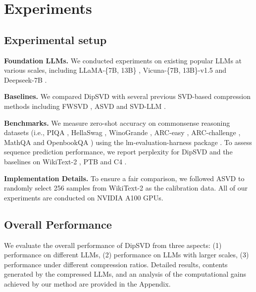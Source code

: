 \documentclass[11pt]{article}
\begin{document}
\section{Experiments}
\subsection{Experimental setup}
\textbf{Foundation LLMs.} We conducted experiments on existing popular LLMs at various scales, including LLaMA-\{7B, 13B\} \citep{touvron2023llama}, Vicuna-\{7B, 13B\}-v1.5 \citep{chiang2023vicuna} and Deepseek-{7B} \citep{deepseekai2025deepseekv3technicalreport}. 


\textbf{Baselines.} We compared DipSVD with several previous SVD-based compression methods including FWSVD \citep{hsu2022language}, ASVD \citep{yuan2023asvd} and SVD-LLM \citep{wang2024svd}.

\textbf{Benchmarks.} We measure zero-shot accuracy on commonsense reasoning datasets (i.e., PIQA \citep{bisk2020piqa}, HellaSwag \citep{zellers2019hellaswag}, WinoGrande \citep{sakaguchi2021winogrande}, ARC-easy \citep{clark2018think}, ARC-challenge \citep{clark2018think}, MathQA\citep{amini2019mathqainterpretablemathword} and OpenbookQA \citep{mihaylov2018can}) using the lm-evaluation-harness package \citep{eval-harness}.  To assess sequence prediction performance, we report perplexity for DipSVD and the baselines on WikiText-2 \citep{merity2016pointersentinelmixturemodels}, PTB \citep{marcus-etal-1993-building} and C4 \citep{mihaylov2018suitarmorconductelectricity}. 

\textbf{Implementation Details.} To ensure a fair comparison, we followed ASVD \citep{yuan2023asvd} to randomly select 256 samples from WikiText-2 as the calibration data. All of our experiments are conducted on NVIDIA A100 GPUs.


\subsection{Overall Performance}

We evaluate the overall performance of DipSVD from three aspects: (1) performance on different LLMs, (2) performance on LLMs with larger scales, (3) performance under different compression ratios. Detailed results, contents generated by the compressed LLMs, and an analysis of the computational gains achieved by our method are provided in the Appendix.
\end{document}

